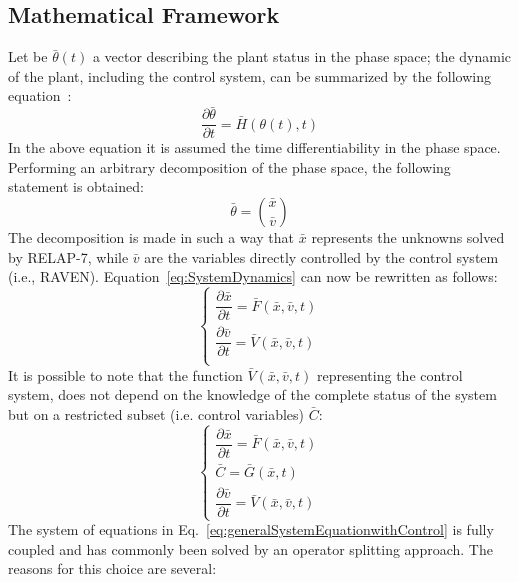 \label{sec:theory}
\subsection{Mathematical Framework}
\label{sec:mathFramework}
Let be $\bar{\theta}(t)$ a vector describing the plant status in the phase space; the dynamic of the plant, including the control system, can be summarized by the following equation~\cite{MathFrameworkMC2013}:
\begin{equation}
\frac{\partial \bar{\theta}}{\partial t} = \bar{H}(\theta(t),t)
\label{eq:SystemDynamics}
\end{equation}
In the above equation it is assumed the time differentiability in the phase space. Performing an arbitrary decomposition of the phase space, the following statement is obtained:
\begin{equation}
\bar{\theta}=\binom{\bar{x}}{\bar{v}}
\label{eq:firstDecomposition}
\end{equation}
The decomposition is made in such a way that $\bar{x}$ represents the unknowns solved by RELAP-7, while $\bar{v}$ are the variables directly controlled by the control system (i.e., RAVEN). Equation~\ref{eq:SystemDynamics} can now be rewritten as follows:
\begin{equation}
\begin{cases} 
\dfrac{\partial \bar{x}}{\partial t} = \bar{F}(\bar{x},\bar{v},t) \\ 
\dfrac{\partial \bar{v}}{\partial t} = \bar{V}(\bar{x},\bar{v},t) \\
\end{cases}
\label{eq:generalSystemEquation}
\end{equation}
It is possible to note that the function $\bar{V}(\bar{x},\bar{v},t)$ representing the control system, does not depend on the knowledge of the complete status of the system but on a restricted subset (i.e. control variables) $\bar{C}$:
\begin{equation}
\begin{cases} 
\dfrac{\partial \bar{x}}{\partial t} = \bar{F}(\bar{x},\bar{v},t) \\
\bar{C} = \bar{G}(\bar{x},t) \\ 
\dfrac{\partial \bar{v}}{\partial t} = \bar{V}(\bar{x},\bar{v},t) 
\end{cases}
\label{eq:generalSystemEquationwithControl}
\end{equation}
The system of equations in Eq.~\ref{eq:generalSystemEquationwithControl} is fully coupled and has commonly been solved by an operator splitting approach. The reasons for this choice are several:
